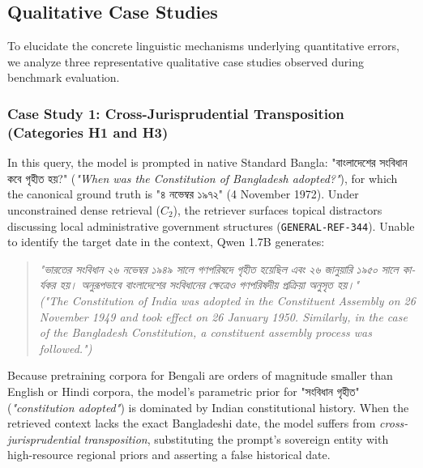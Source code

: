 \subsection{Qualitative Case Studies}
To elucidate the concrete linguistic mechanisms underlying quantitative errors, we analyze three representative qualitative case studies observed during benchmark evaluation.

\subsubsection{Case Study 1: Cross-Jurisprudential Transposition (Categories H1 and H3)}
In this query, the model is prompted in native Standard Bangla: \foreignlanguage{bengali}{"বাংলাদেশের সংবিধান কবে গৃহীত হয়?"} (\emph{"When was the Constitution of Bangladesh adopted?"}), for which the canonical ground truth is \foreignlanguage{bengali}{"৪ নভেম্বর ১৯৭২"} (4 November 1972). Under unconstrained dense retrieval ($C_2$), the retriever surfaces topical distractors discussing local administrative government structures (\texttt{GENERAL-REF-344}). Unable to identify the target date in the context, Qwen 1.7B generates:
\begin{quote}
    \foreignlanguage{bengali}{\emph{"ভারতের সংবিধান ২৬ নভেম্বর ১৯৪৯ সালে গণপরিষদে গৃহীত হয়েছিল এবং ২৬ জানুয়ারি ১৯৫০ সালে কার্যকর হয়। অনুরূপভাবে বাংলাদেশের সংবিধানের ক্ষেত্রেও গণপরিষদীয় প্রক্রিয়া অনুসৃত হয়।"}} \\
    \emph{("The Constitution of India was adopted in the Constituent Assembly on 26 November 1949 and took effect on 26 January 1950. Similarly, in the case of the Bangladesh Constitution, a constituent assembly process was followed.")}
\end{quote}
Because pretraining corpora for Bengali are orders of magnitude smaller than English or Hindi corpora, the model's parametric prior for \foreignlanguage{bengali}{"সংবিধান গৃহীত"} (\emph{"constitution adopted"}) is dominated by Indian constitutional history. When the retrieved context lacks the exact Bangladeshi date, the model suffers from \emph{cross-jurisprudential transposition}, substituting the prompt's sovereign entity with high-resource regional priors and asserting a false historical date.


